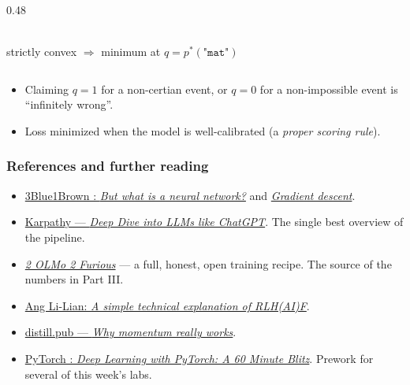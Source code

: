 \begin{frame}
\begin{columns}[T]
\begin{column}{0.48\textwidth}
\\[4pt]
        {\footnotesize strictly convex $\Rightarrow$ minimum at $q = p^*(\texttt{"mat"})$}
        \end{column}
        \end{columns}
        \begin{itemize}
        \item Claiming $q=1$ for a non-certian event, or $q=0$ for a non-impossible event is 
        ``infinitely wrong''. 
        \item Loss minimized when the model is well-calibrated (a \emph{proper scoring rule}).
        \end{itemize}
        \end{frame}
        

\begin{frame}
\frametitle{References and further reading}
\begin{itemize}
    \item \href{https://www.3blue1brown.com/lessons/neural-networks}{3Blue1Brown
   : \textit{But what is a neural network?}} and
    \href{https://www.3blue1brown.com/lessons/gradient-descent}{\textit{Gradient
    descent}}.
    \item \href{https://www.youtube.com/watch?v=7xTGNNLPyMI}{Karpathy ---
    \textit{Deep Dive into LLMs like ChatGPT}}. The single best overview of the
    pipeline.
    \item \href{https://arxiv.org/abs/2501.00656}{\textit{2 OLMo 2 Furious}} ---
    a full, honest, open training recipe. The source of the numbers in Part III.
    \item \href{https://anglilian.com/blog/a-simple-technical-explanation-of-rlhaif}{Ang
    Li-Lian: \textit{A simple technical explanation of RLH(AI)F}}.
    \item \href{https://distill.pub/2017/momentum/}{distill.pub ---
    \textit{Why momentum really works}}.
    \item \href{https://docs.pytorch.org/tutorials/beginner/blitz/index.html}{PyTorch
   : \textit{Deep Learning with PyTorch: A 60 Minute Blitz}}. Prework for
    several of this week's labs.
\end{itemize}
\end{frame}





